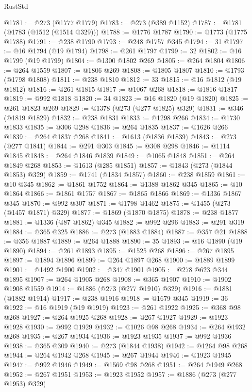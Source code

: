 \begin{lexlean}{RustStd}
\begin{coremodule}
{{{{{{{{{{{{{{{{{{{@1781 := @273 (@1777 @1779)
@1783 := @273 (@389 @1152)
@1787 := @1781 (@1783 (@1512 (@1514 @329)))
@1788 := @1776 @1787
@1790 := @1773 (@1775 @1788)
@1791 := @238 @1790
@1793 := @248 @1757 @345
@1794 := 31
@1797 := @16 @1794 (@19 @1794)
@1798 := @261 @1797
@1799 := 32
@1802 := @16 @1799 (@19 @1799)
@1804 := @1300 @1802 @269
@1805 := @264 @1804
@1806 := @264 @1559
@1807 := @1806 @269
@1808 := @1805 @1807
@1810 := @1793 (@1798 @1808)
@1811 := @238 @1810
@1812 := 33
@1815 := @16 @1812 (@19 @1812)
@1816 := @261 @1815
@1817 := @1067 @268
@1818 := @1816 @1817
@1819 := @992 @1818
@1820 := 34
@1823 := @16 @1820 (@19 @1820)
@1825 := @261 @1823 @269
@1829 := @1378 (@273 (@277 @1825) @329)
@1831 := @346 (@1819 @1829)
@1832 := @238 @1831
@1833 := @1298 @266
@1834 := @1730 @1833
@1835 := @306 @298
@1836 := @264 @1835
@1837 := @1626 @266
@1839 := @264 @1837 @268
@1841 := @1613 (@1836 @1839)
@1843 := @273 (@277 @1841)
@1844 := @291 @303
@1845 := @308 @298
@1846 := @1114 @1845
@1848 := @264 @1846 @1839
@1849 := @1065 @1848
@1851 := @264 @1849 @268
@1853 := @1613 (@285 @1851)
@1857 := @1843 (@273 (@1844 @1853) @329)
@1859 := @1741 (@1834 @1857)
@1860 := @238 @1859
@1861 := @10 @345
@1862 := @1861 @1752
@1864 := @1388 @1862 @345
@1865 := @10 @1864
@1866 := @1861 @1757
@1867 := @1865 @1866
@1869 := @1336 @1867 @345
@1870 := @992 @307
@1871 := @1798 @1462
@1875 := @1455 (@273 (@1457 @1871) @329)
@1877 := @1869 (@1870 @1875)
@1878 := @238 @1877
@1881 := @1336 (@87 @1862) @345
@1882 := @992 @296
@1883 := @291 @319
@1884 := @365 @325
@1886 := @273 (@1883 @1884)
@1887 := @357 @21
@1888 := @356 @1887
@1889 := @264 @1888
@1890 := 35
@1893 := @16 @1890 (@19 @1890)
@1894 := @261 @1893
@1895 := @1525 @268
@1896 := @267 @1895
@1897 := @1894 @1896
@1899 := @264 @1897 @268
@1900 := @1889 @1899
@1901 := @1492 @1900
@1902 := @347 @1901
@1905 := @278 @623 @344 @1895
@1907 := @264 @1905 @268
@1908 := @365 @1907
@1910 := @1902 @1908 @1559
@1914 := @1886 (@273 (@277 @1910) @329)
@1916 := @1881 (@1882 @1914)
@1917 := @238 @1916
@1918 := @1679 @345
@1919 := 36
@1922 := @16 @1919 (@19 @1919)
@1923 := @261 @1922
@1925 := @368 @98 @268
@1927 := @264 @1925 @268
@1928 := @267 @1927
@1929 := @1923 @1928
@1930 := @992 @1929
@1932 := @1026 @98 @268
@1934 := @264 @1932 @268
@1935 := @267 @1934
@1936 := @1923 @1935
@1937 := @992 @1936
@1938 := @365 @309
@1940 := @273 (@1844 @1938)
@1942 := @1264 @98 @268
@1944 := @264 @1942 @268
@1945 := @267 @1944
@1946 := @1923 @1945
@1947 := @992 @1946
@1949 := @1569 @98 @268
@1951 := @264 @1949 @268
@1952 := @267 @1951
@1953 := @1923 @1952
@1957 := @1886 (@273 (@277 @1953) @329)
}}}}}}}}}}}}}}}}}}}
\end{coremodule}
\end{lexlean}
